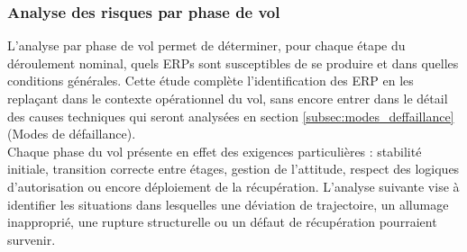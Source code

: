 \newpage

\subsubsection{Analyse des risques par phase de vol}
\label{subsubsec:analyse_par_phase}

L’analyse par phase de vol permet de déterminer, pour chaque étape du déroulement nominal, quels \acrshort{ERPs} sont
susceptibles de se produire et dans quelles conditions générales. Cette étude complète l’identification des \acrshort{ERP} en
les replaçant dans le contexte opérationnel du vol, sans encore entrer dans le détail des causes techniques qui seront
analysées en section \ref{subsec:modes_deffaillance} (Modes de défaillance).\\

Chaque phase du vol présente en effet des exigences particulières : stabilité initiale, transition correcte entre étages,
gestion de l’attitude, respect des logiques d’autorisation ou encore déploiement de la récupération. L’analyse suivante vise à
identifier les situations dans lesquelles une déviation de trajectoire, un allumage inapproprié, une rupture structurelle ou un
défaut de récupération pourraient survenir.

